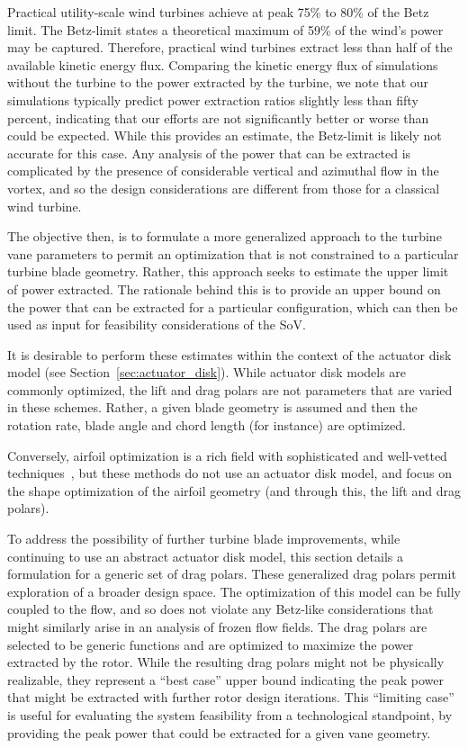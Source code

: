 Practical utility-scale wind turbines achieve at peak 75\% to 80\% of
the Betz limit\cite{burton2001wind}. The Betz-limit states a theoretical
maximum of 59\% of the wind's power may be captured. Therefore,
practical wind turbines extract less than half of the available kinetic
energy flux. 
Comparing the kinetic energy flux of simulations without the turbine to
the power extracted by the turbine, we note that our simulations
typically predict power extraction ratios slightly less than fifty
percent, indicating that our efforts are not significantly better or
worse than could be expected. While this provides an estimate, the
Betz-limit is likely not accurate for this case. Any analysis of the
power that can be extracted is complicated by the presence of
considerable vertical and azimuthal flow in the vortex, and so the
design considerations are different from those for a classical wind
turbine.  

The objective then, is to formulate a more generalized approach to the
turbine vane parameters to permit an optimization that is not
constrained to a particular turbine blade geometry. Rather, this
approach seeks to estimate the upper limit of power extracted. The
rationale behind this is to provide an upper bound on the power that can 
be extracted for a particular configuration, which can then be used as
input for feasibility considerations of the SoV.  

It is desirable to perform these estimates within the context of the
actuator disk model (see Section~\ref{sec:actuator_disk}). While
actuator disk models are commonly
optimized\cite{790585,WE:WE487,en5093425,adkins1983design}, the lift and 
drag polars are not parameters that are varied in these schemes. Rather,
a given blade geometry is assumed and then the rotation rate, blade
angle and chord length (for instance) are optimized.   

Conversely, airfoil optimization is a rich field with sophisticated and
well-vetted
techniques~\cite{drela1998pros,lewis2001aerodynamic,Chehouri2015361},
but these methods do not use an actuator disk model, and focus on the
shape optimization of the airfoil geometry (and through this, the lift
and drag polars).  

To address the possibility of further turbine blade
improvements, while continuing to use an abstract actuator disk model,
this section details a formulation for a generic set of drag 
polars. These generalized drag polars permit exploration of a broader
design space. The optimization of this model can be fully coupled to the
flow, and so does not violate any Betz-like considerations that might
similarly arise in an analysis of frozen flow fields.
The drag polars are selected to be generic functions and are optimized to
maximize the power extracted by the rotor. While the resulting drag
polars might not be physically  realizable, they represent a ``best
case'' upper bound indicating the peak power that might be extracted
with further rotor design iterations. This ``limiting case'' is useful
for evaluating the system feasibility from a technological standpoint,
by providing the peak power that could be extracted for a given vane
geometry. 

